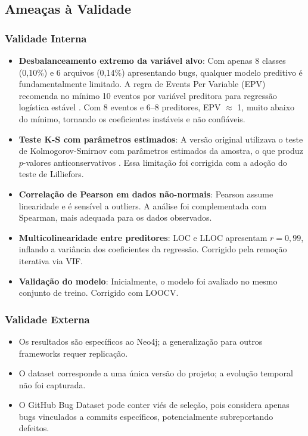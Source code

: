\documentclass[12pt]{article}
\begin{document}
\subsection{Ameaças à Validade} \label{sec:ameacas}

\subsubsection{Validade Interna}
\begin{itemize}
  \item \textbf{Desbalanceamento extremo da variável alvo}: Com apenas 8 classes (0,10\%) e 6 arquivos (0,14\%) apresentando bugs, qualquer modelo preditivo é fundamentalmente limitado. A regra de Events Per Variable (EPV) recomenda no mínimo 10 eventos por variável preditora para regressão logística estável \cite{hosmer2013}. Com 8 eventos e 6--8 preditores, EPV $\approx$ 1, muito abaixo do mínimo, tornando os coeficientes instáveis e não confiáveis.
  \item \textbf{Teste K-S com parâmetros estimados}: A versão original utilizava o teste de Kolmogorov-Smirnov com parâmetros estimados da amostra, o que produz $p$-valores anticonservativos \cite{lilliefors1967}. Essa limitação foi corrigida com a adoção do teste de Lilliefors.
  \item \textbf{Correlação de Pearson em dados não-normais}: Pearson assume linearidade e é sensível a outliers. A análise foi complementada com Spearman, mais adequada para os dados observados.
  \item \textbf{Multicolinearidade entre preditores}: LOC e LLOC apresentam $r = 0{,}99$, inflando a variância dos coeficientes da regressão. Corrigido pela remoção iterativa via VIF.
  \item \textbf{Validação do modelo}: Inicialmente, o modelo foi avaliado no mesmo conjunto de treino. Corrigido com LOOCV.
\end{itemize}

\subsubsection{Validade Externa}
\begin{itemize}
  \item Os resultados são específicos ao Neo4j; a generalização para outros frameworks requer replicação.
  \item O dataset corresponde a uma única versão do projeto; a evolução temporal não foi capturada.
  \item O GitHub Bug Dataset pode conter viés de seleção, pois considera apenas bugs vinculados a commits específicos, potencialmente subreportando defeitos.
\end{itemize}
\end{document}
